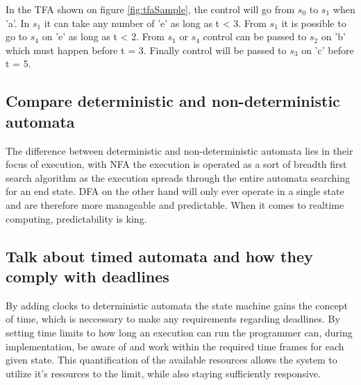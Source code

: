 \noindent In the TFA shown on figure \ref{fig:tfaSample}, the control will go from $s_0$ to $s_1$ when 'a'. In $s_1$ it can take any number of 'e' as long as t < 3. From $s_1$ it is possible to go to $s_4$ on 'e' as long as t < 2. From $s_1$ or $s_4$ control can be passed to $s_2$ on 'b' which must happen before t = 3. Finally control will be passed to $s_3$ on 'c' before t = 5.

\subsection{Compare deterministic and non-deterministic automata}
The difference between deterministic and non-deterministic automata lies in their focus of execution, with NFA the execution is operated as a sort of breadth first search algorithm as the execution spreads through the entire automata searching for an end state. DFA on the other hand will only ever operate in a single state and are therefore more manageable and predictable. When it comes to realtime computing, predictability is king.

\subsection{Talk about timed automata and how they comply with deadlines}
By adding clocks to deterministic automata the state machine gains the concept of time, which is neccessary to make any requirements regarding deadlines. By setting time limits to how long an execution can run the programmer can, during implementation, be aware of and work within the required time frames for each given state. This quantification of the available resources allows the system to utilize it's resources to the limit, while also staying sufficiently responsive. 

